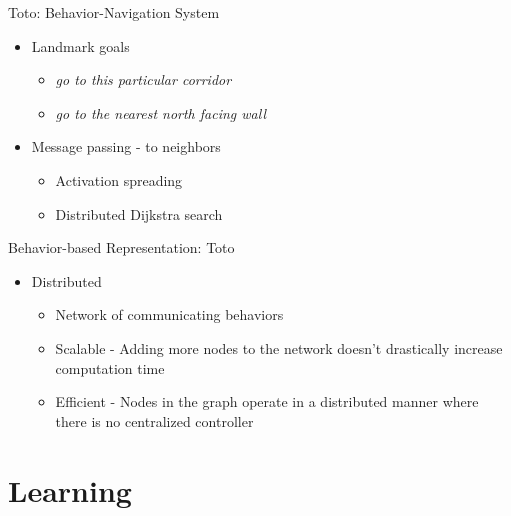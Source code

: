 \documentclass{beamer}
\begin{document}
\begin{frame}{Toto: Behavior-Navigation System}
 \begin{itemize}
  \item Landmark goals
  \begin{itemize}
   \item \emph{go to this particular corridor}
   \item \emph{go to the nearest north facing wall}
  \end{itemize}
  \item Message passing - to neighbors
  \begin{itemize}
   \item Activation spreading
   \item Distributed Dijkstra search
  \end{itemize}
 \end{itemize}
\end{frame}

\begin{frame}{Behavior-based Representation: Toto}
 \begin{itemize}
  \item Distributed
  \begin{itemize}
   \item Network of communicating behaviors
   \item Scalable - Adding more nodes to the network doesn't drastically increase computation time
   \item Efficient - Nodes in the graph operate in a distributed manner where there is no centralized controller
  \end{itemize}
 \end{itemize}
\end{frame}

\section{Learning}
\end{document}
